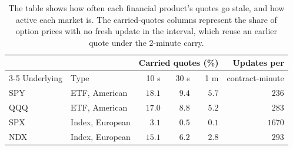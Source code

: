 \begin{table}[tbp]
\centering
\footnotesize
\setlength{\tabcolsep}{4pt}
\begin{tabular}{llrrrr}
\toprule
 & & \multicolumn{3}{c}{Carried quotes (\%)} & Updates per \\
\cmidrule(lr){3-5}
Underlying & Type & 10 s & 30 s & 1 m & contract-minute \\
\midrule
SPY & ETF, American & $18.1$ & $9.4$ & $5.7$ & $236$ \\
QQQ & ETF, American & $17.0$ & $8.8$ & $5.2$ & $283$ \\
SPX & Index, European & $3.1$ & $0.5$ & $0.1$ & $1670$ \\
NDX & Index, European & $15.1$ & $6.2$ & $2.8$ & $293$ \\
\bottomrule
\end{tabular}
\caption{The table shows how often each financial product's quotes go stale, and how active each market is. The carried-quotes columns represent the share of option prices with no fresh update in the interval, which reuse an earlier quote under the 2-minute carry.}
\label{tab:staleness}
\end{table}
